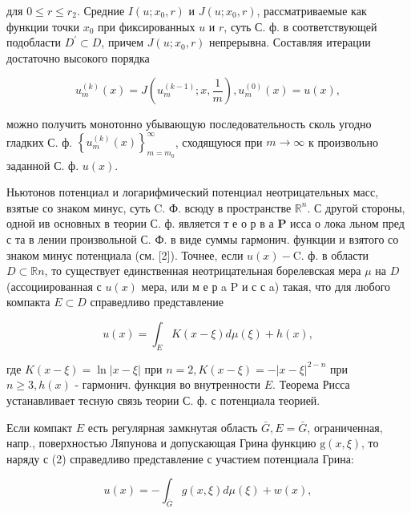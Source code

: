 \documentclass[10pt]{article}
\begin{document}
для $0 \leqslant r \leqslant r_{2}$. Средние $I\left(u ; x_{0}, r\right)$ и $J\left(u ; x_{0}, r\right)$, рассматриваемые как функции точки $x_{0}$ при фиксированных $u$ и $r$, суть С. ф. в соответствующей подобласти $D^{\prime} \subset D$, причем $J\left(u ; x_{0}, r\right)$ непрерывна. Составляя итерации достаточно высокого порядка



\[

u_{m}^{(k)}(x)=J\left(u_{m}^{(k-1)} ; x, \frac{1}{m}\right), u_{m}^{(0)}(x)=u(x),

\]



можно получить монотонно убывающую последовательность сколь угодно гладких С. ф. $\left\{u_{m}^{(k)}(x)\right\}_{m=m_{0}}^{\infty}$, сходящуюся при $m \rightarrow \infty$ к произвольно заданной С. ф. $u(x)$.



Ньютонов потенциал и логарифмический потенциал неотрицательных масс, взятые со знаком минус, суть C. Ф. всюду в пространстве $\mathbb{R}^{n}$. С другой стороны, одной ив основных в теории С. ф. является т е о р в а $\mathbf{P}$ исса о лока льном пред с та в лении произвольной С. Ф. в виде суммы гармонич. функции и взятого со знаком минус потенциала (см. [2]). Точнее, если $u(x)-\mathrm{C}$. ф. в области $D \subset \mathbb{R} n$, то существует единственная неотрицательная борелевская мера $\mu$ на $D$ (ассоциированная с $u(x)$ мера, или м е р a $\mathrm{P}$ и с с a) такая, что для любого компакта $E \subset D$ справедливо представление



\[

u(x)=\int_{E} K(x-\xi) d \mu(\xi)+h(x),

\]



где $K(x-\xi)=\ln |x-\xi|$ при $n=2, K(x-\xi)=-|x-\xi|^{2-n}$ при $n \geqslant 3, h(x)$ - гармонич. функция во внутренности $E$. Теорема Рисса устанавливает тесную связь теории С. ф. с потенциала теорией.



Если компакт $E$ есть регулярная замкнутая область $\bar{G}, E=\bar{G}$, ограниченная, напр., поверхностью Ляпунова и допускающая Грина функцию $\mathrm{g}(x, \xi)$, то наряду с (2) справедливо представление с участием потенциала Грина:



\[

u(x)=-\int_{\bar{G}} g(x, \xi) d \mu(\xi)+w(x),

\]
\end{document}
